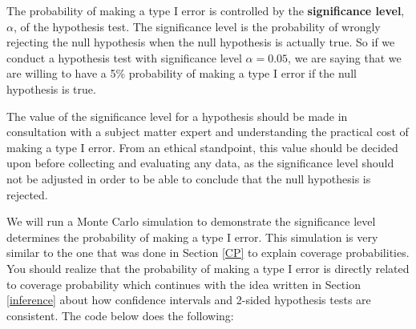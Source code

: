 \documentclass[
]{book}
\begin{document}
The probability of making a type I error is controlled by the \textbf{significance level}, \(\alpha\), of the hypothesis test. The significance level is the probability of wrongly rejecting the null hypothesis when the null hypothesis is actually true. So if we conduct a hypothesis test with significance level \(\alpha = 0.05\), we are saying that we are willing to have a 5\% probability of making a type I error if the null hypothesis is true.

The value of the significance level for a hypothesis should be made in consultation with a subject matter expert and understanding the practical cost of making a type I error. From an ethical standpoint, this value should be decided upon before collecting and evaluating any data, as the significance level should not be adjusted in order to be able to conclude that the null hypothesis is rejected.

We will run a Monte Carlo simulation to demonstrate the significance level determines the probability of making a type I error. This simulation is very similar to the one that was done in Section \ref{CP} to explain coverage probabilities. You should realize that the probability of making a type I error is directly related to coverage probability which continues with the idea written in Section \ref{inference} about how confidence intervals and 2-sided hypothesis tests are consistent. The code below does the following:
\end{document}

